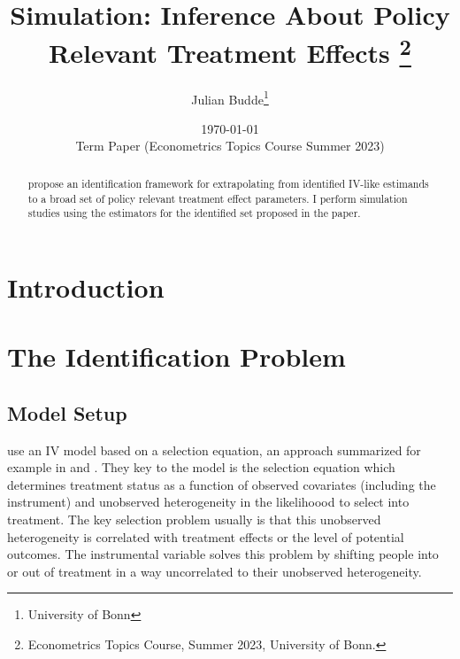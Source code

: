 \documentclass[11pt, a4paper, leqno]{article}
\begin{document}
\title{Simulation: Inference About Policy Relevant Treatment Effects \thanks{Econometrics Topics Course, Summer 2023, University of Bonn.}}

\author{Julian Budde\thanks{University of Bonn}}

\date{\today \\ \vspace{1em} Term Paper (Econometrics Topics Course Summer 2023)}
\maketitle


\begin{abstract}
\citet{mogstad2018using} propose an identification framework for extrapolating from identified IV-like estimands to a broad set of policy relevant treatment effect parameters.
I perform simulation studies using the estimators for the identified set proposed in the paper.
\end{abstract}

\clearpage
\pagebreak

\tableofcontents
\clearpage
\newpage


\section{Introduction}

\section{The Identification Problem}
\subsection{Model Setup}
\citet{mogstad2018using} use an IV model based on a selection equation, an approach summarized for example in \citet{heckman2007econometric1} and \citet{heckman2007econometric2}.
They key to the model is the selection equation which determines treatment status as a function of observed covariates (including the instrument) and unobserved heterogeneity in the likelihoood to select into treatment.
The key selection problem usually is that this unobserved heterogeneity is correlated with treatment effects or the level of potential outcomes.
The instrumental variable solves this problem by shifting people into or out of treatment in a way uncorrelated to their unobserved heterogeneity.
\end{document}
